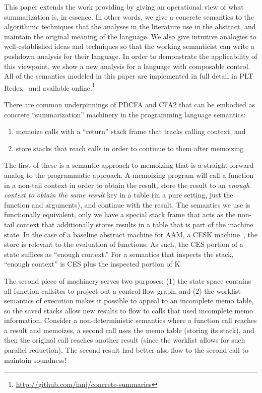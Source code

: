 This paper extends the work providing  by giving an operational view of what summarization is, in essence.
%
In other words, we give a concrete semantics to the algorithmic techniques that the analyses in the literature use in the abstract, and maintain the original meaning of the language.
%
We also give intuitive analogies to well-established ideas and techniques so that the working semanticist can write a pushdown analysis for their language.
%
In order to demonstrate the applicability of this viewpoint, we show a new analysis for a language with composable control.
%
All of the semantics modeled in this paper are implemented in full detail in PLT Redex~\citep{ianjohnson:Felleisen:2009:SEP:1795772} and available online.\footnote{\url{http://github.com/ianj/concrete-summaries}}

There are common underpinnings of PDCFA and CFA2 that can be embodied as concrete ``summarization'' machinery in the programming language semantics: 
\begin{enumerate}
\item{memoize calls with a ``return'' stack frame that tracks calling context, and}
\item{store stacks that reach calls in order to continue to them after memoizing}
\end{enumerate}

The first of these is a semantic approach to memoizing that is a straight-forward analog to the programmatic approach.
%
A memoizing program will call a function in a non-tail context in order to obtain the result, store the result to an \emph{enough context to obtain the same result} key in a table (in a pure setting, just the function and arguments), and continue with the result.
%
The semantics we use is functionally equivalent, only we have a special stack frame that acts as the non-tail context that additionally stores results in a table that is part of the machine state.
%
In the case of a baseline abstract machine for AAM, a CESK machine~\citep{dvanhorn:Felleisen1987Calculus}, the store is relevant to the evaluation of functions.
%
As such, the CES portion of a state suffices as ``enough context.''
%
For a semantics that inspects the stack, ``enough context'' is CES plus the inspected portion of K.

The second piece of machinery serves two purposes:
%
(1) the state space contains all function callsites to project out a control-flow graph, and %
(2) the worklist semantics of execution makes it possible to appeal to an incomplete memo table, so the saved stacks allow new results to flow to calls that used incomplete memo information.
%
Consider a non-deterministic semantics where a function call reaches a result and memoizes, a second call uses the memo table (storing its stack), and then the original call reaches another result (since the worklist allows for such parallel reduction).
%
The second result had better also flow to the second call to maintain soundness!

